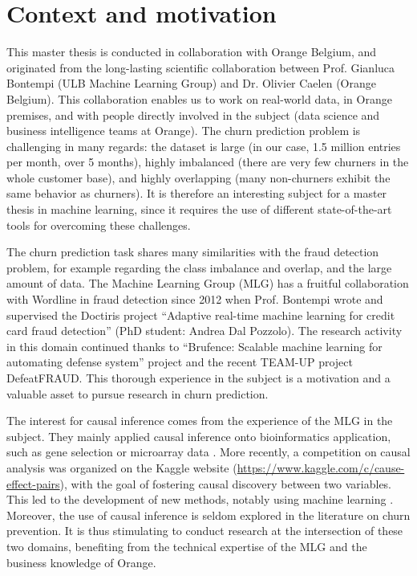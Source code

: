 \section{Context and motivation}

This master thesis is conducted in collaboration with Orange Belgium, and
originated from the long-lasting scientific collaboration between Prof. Gianluca
Bontempi (ULB Machine Learning Group) and Dr. Olivier Caelen (Orange Belgium).
This collaboration enables us to work on real-world data, in Orange
premises, and with people directly involved in the subject (data science and
business intelligence teams at Orange). The churn prediction problem is
challenging in many regards: the dataset is large (in our case, 1.5 million
entries per month, over 5 months), highly imbalanced (there are very few
churners in the whole customer base), and highly overlapping (many non-churners
exhibit the same behavior as churners). It is therefore an interesting subject
for a master thesis in machine learning, since it requires the use of different
state-of-the-art tools for overcoming these challenges.

The churn prediction task shares many similarities with the fraud detection
problem, for example regarding the class imbalance and overlap, and the large
amount of data. The Machine Learning Group (MLG) has a fruitful collaboration
with Wordline in fraud detection since 2012 when Prof. Bontempi wrote and
supervised the Doctiris project ``Adaptive real-time machine learning for credit
card fraud detection'' (PhD student: Andrea Dal Pozzolo). The research activity
in this domain continued thanks to ``Brufence: Scalable machine learning for
automating defense system'' project and the recent TEAM-UP project DefeatFRAUD.
This thorough experience in the subject is a motivation and a valuable asset to
pursue research in churn prediction.

The interest for causal inference comes from the experience of the MLG in the
subject. They mainly applied causal inference onto bioinformatics application,
such as gene selection \parencite{bontempi2011multiple} or microarray data
\parencite{bontempi2010causal}. More recently, a competition on causal analysis
was organized on the Kaggle website
(\url{https://www.kaggle.com/c/cause-effect-pairs}), with the goal of fostering
causal discovery between two variables. This led to the development of new
methods, notably using machine learning \parencite{bontempi2015dependency}.
Moreover, the use of causal inference is seldom explored in the literature on
churn prevention. It is thus stimulating to conduct research at the intersection
of these two domains, benefiting from the technical expertise of the MLG and
the business knowledge of Orange.

